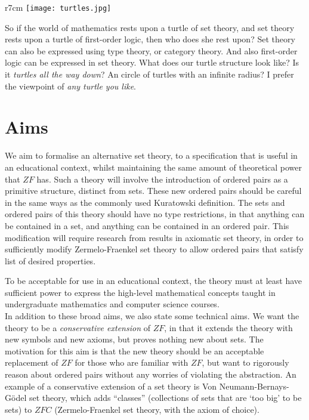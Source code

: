 \documentclass[11pt]{report}
\theoremstyle{definition}
\theoremstyle{theorem}
\theoremstyle{lemma}
\begin{document}
\begin{wrapfigure}{r}{7cm}
\centering
\texttt{[image: turtles.jpg]}
\end{wrapfigure}
\noindent
So if the world of mathematics rests upon a turtle of set theory, and set theory rests upon a turtle of first-order logic, then who does she rest upon? 
Set theory can also be expressed using type theory, or category theory. And also first-order logic can be expressed in set theory.
What does our turtle structure look like? 
Is it \emph{turtles all the way down}? 
An circle of turtles with an infinite radius?
I prefer the viewpoint of \emph{any turtle you like}. 
\clearpage

\section{Aims}
We aim to formalise an alternative set theory, to a specification that is useful in an educational context, whilst maintaining the same amount of theoretical power that $\mathit{ZF}$ has.
Such a theory will involve the introduction of ordered pairs as a primitive structure, distinct from sets.
These new ordered pairs should be careful in the same ways as the commonly used Kuratowski definition.
The sets and ordered pairs of this theory should have no type restrictions, in that anything can be contained in a set, and anything can be contained in an ordered pair.
This modification will require research from results in axiomatic set theory, in order to sufficiently modify Zermelo-Fraenkel set theory to allow ordered pairs that satisfy list of desired properties.

To be acceptable for use in an educational context, the theory must at least have sufficient power to express the high-level mathematical concepts taught in undergraduate mathematics and computer science courses.\\

In addition to these broad aims, we also state some technical aims. 
We want the theory to be a \emph{conservative extension} of $\mathit{ZF}$, in that it extends the theory with new symbols and new axioms, but proves nothing new about sets.
The motivation for this aim is that the new theory should be an acceptable replacement of $\mathit{ZF}$ for those who are familiar with $\mathit{ZF}$, but want to rigorously reason about ordered pairs without any worries of violating the abstraction.
An example of a conservative extension of a set theory is Von Neumann-Bernays-G\"odel set theory, which adds ``classes'' (collections of sets that are `too big' to be sets) to $\mathit{ZFC}$ (Zermelo-Fraenkel set theory, with the axiom of choice). 
\end{document}
